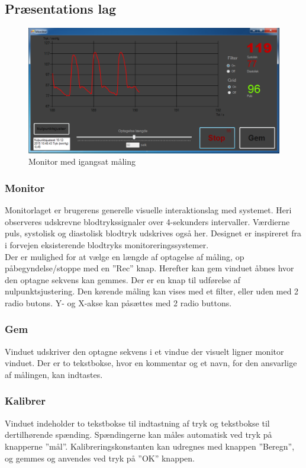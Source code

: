 \subsection{Præsentations lag}
\begin{figure}[H]
	\centering
	\includegraphics[width=1\textwidth]{Figurer/Monitor_vindue_Recording}
	\caption{Monitor med igangsat måling}
\end{figure}

\subsubsection{Monitor}
Monitorlaget er brugerens generelle visuelle interaktionslag med systemet. Heri observeres udskrevne blodtrykssignaler over 4-sekunders intervaller. Værdierne puls, systolisk og diastolisk blodtryk udskrives også her. Designet er inspireret fra i forvejen eksisterende blodtryks monitoreringssystemer. \\
Der er mulighed for at vælge en længde af optagelse af måling, op påbegyndelse/stoppe med en ”Rec” knap. Herefter kan gem vinduet åbnes hvor den optagne sekvens kan gemmes. Der er en knap til udførelse af nulpunktsjustering. Den kørende måling kan vises med et filter, eller uden med 2 radio butons. Y- og X-akse kan påsættes med 2 radio buttons. 

\subsubsection{Gem}
Vinduet udskriver den optagne sekvens i et vindue der visuelt ligner monitor vinduet. Der er to tekstbokse, hvor en kommentar og et navn, for den ansvarlige af målingen, kan indtastes.

\subsubsection{Kalibrer}
Vinduet indeholder to tekstbokse til indtastning af tryk og tekstbokse til dertilhørende spænding. Spændingerne kan måles automatisk ved tryk på knapperne ”mål”.
Kalibreringskonstanten kan udregnes med knappen ”Beregn”, og gemmes og anvendes ved tryk på ”OK” knappen.

